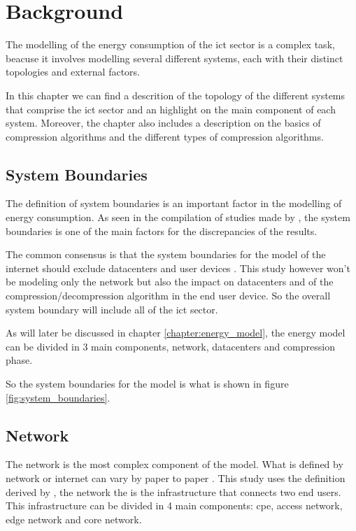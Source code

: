 

\chapter{Background}
\label{chapter:background}

\begin{introduction}
    
    The modelling of the energy consumption of the \ac{ict} sector is a complex task, beacuse it involves modelling several different systems, each with their distinct topologies and external factors.

    In this chapter we can find a descrition of the topology of the different systems that comprise the \ac{ict} sector and an highlight on the main component of each system. Moreover, the chapter also includes a description on the basics of compression algorithms and the different types of compression algorithms.

\end{introduction}

\section{System Boundaries}

The definition of system boundaries is an important factor in the modelling of energy consumption. As seen in the compilation of studies made by \citet{Aslan2018}, the system boundaries is one of the main factors for the discrepancies of the results.

The common consensus is that the system boundaries for the model of the internet should exclude datacenters and user devices \citet{Coroama2014}. This study however won't be modeling only the network but also the impact on datacenters and of the compression/decompression algorithm in the end user device. So the overall system boundary will include all of the \ac{ict} sector. 

As will later be discussed in chapter \ref{chapter:energy_model}, the energy model can be divided in 3 main components, network, datacenters and compression phase.

So the system boundaries for the model is what is shown in figure \ref{fig:system_boundaries}.

\section{Network}

The network is the most complex component of the model. What is defined by network or internet can vary by paper to paper \citet{Aslan2018}. This study uses the definition derived by \citet{Coroama2015}, the network the is the infrastructure that connects two end users. This infrastructure can be divided in 4 main components: \ac{cpe}, access network, edge network and core network.

